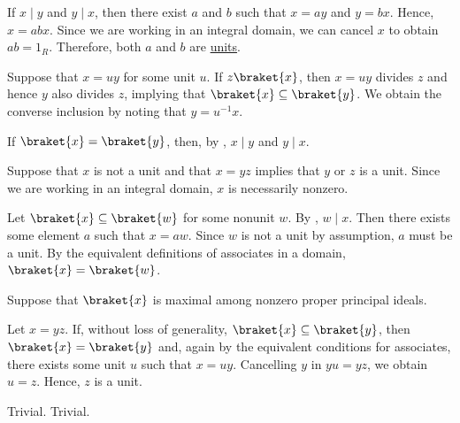 \begin{defproof}
   If \( x \mid y \) and \( y \mid x \), then there exist \( a \) and \( b \) such that \( x = ay \) and \( y = bx \). Hence, \( x = abx \). Since we are working in an integral domain, we can cancel \( x \) to obtain \( ab = 1_R \). Therefore, both \( a \) and \( b \) are \hyperref[def:divisibility/unit]{units}.

   Suppose that \( x = uy \) for some unit \( u \). If \( z \braket{ x } \), then \( x = uy \) divides \( z \) and hence \( y \) also divides \( z \), implying that \( \braket{ x } \subseteq \braket{ y } \). We obtain the converse inclusion by noting that \( y = u^{-1} x \).

   If \( \braket{ x } = \braket{ y } \), then, by , \( x \mid y \) and \( y \mid x \).

   Suppose that \( x \) is not a unit and that \( x = yz \) implies that \( y \) or \( z \) is a unit. Since we are working in an integral domain, \( x \) is necessarily nonzero.

  Let \( \braket{ x } \subseteq \braket{ w } \) for some nonunit \( w \). By , \( w \mid x \). Then there exists some element \( a \) such that \( x = aw \). Since \( w \) is not a unit by assumption, \( a \) must be a unit. By the equivalent definitions of associates in a domain, \( \braket{ x } = \braket{ w } \).

   Suppose that \( \braket{ x } \) is maximal among nonzero proper principal ideals.

  Let \( x = yz \). If, without loss of generality, \( \braket{ x } \subseteq \braket{ y } \), then \( \braket{ x } = \braket{ y } \) and, again by the equivalent conditions for associates, there exists some unit \( u \) such that \( x = uy \). Cancelling \( y \) in \( yu = yz \), we obtain \( u = z \). Hence, \( z \) is a unit.

   Trivial.
   Trivial.
\end{defproof}

